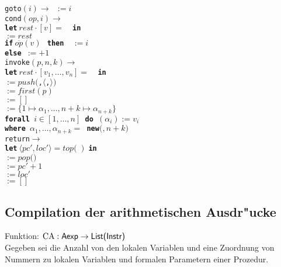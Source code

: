 \documentclass[german,10pt, a4paper, twocolumn]{scrartcl}
\theoremstyle{definition}
\theoremstyle{remark}
\begin{document}
\begin{tabbing}
 \>	\tt{goto}$(i)\rightarrow$  $:= i$\\
 \>	\tt{cond}$(op,i)\rightarrow$\\
 \>	\>	\textbf{let}$\ rest\cdotp[v]=$ \ \textbf{in}\\
 \>	\>	\>	$:=rest$\\
 \>	\>	\>	\textbf{if}$\ \overline{op}(v)\ $ \textbf{then}\  $:=i$\\
 \>	\>	\>	\textbf{else}\ $:=$$+1$\\
 \>	\tt{invoke}$(p,n,k)\rightarrow$\\
 \>	\>	\textbf{let}$\ rest\cdotp[v_1,\ldots,v_n]=$ \ \textbf{in}\\
 \>	\>	\>	$:= push($,$\langle$,$\rangle)$\\
 \>	\>	\>	$:=first(p)$\\
 \>	\>	\>	$:=[]$\\
 \>	\>	\>	$:=\{ 1\mapsto \alpha_1,\ldots,n+k\mapsto\alpha_{n+k}\}$\\
 \>	\>	\>	\textbf{forall}\ $i\in[1,\ldots,n]$\ \textbf{do}\ $(\alpha_i):=v_i$\\
 \>	\>	\textbf{where}\ $\alpha_1,\ldots,\alpha_{n+k}=$ \textbf{new}$($$,n+k)$\\
 \>	\tt{return}$\rightarrow$\\
 \>	\>	\textbf{let}$\ \langle pc',loc' \rangle=top($ $)$\ \textbf{in}\\
 \>	\>	\>	$:=pop($$)$\\
 \>	\>	\>	$:= pc' + 1$\\
 \>	\>	\>	$:=loc'$\\
 \>	\>	\>	$:=[]$\\
\end{tabbing}


\subsection{Compilation der arithmetischen Ausdr"ucke}

Funktion: $\mbox{CA}:\mbox{\sffamily Aexp} \rightarrow \mbox{\sffamily{List(Instr)}}$\\

Gegeben sei die Anzahl von den lokalen Variablen und eine Zuordnung von Nummern zu lokalen Variablen und formalen Parametern einer Prozedur.\\
\end{document}
